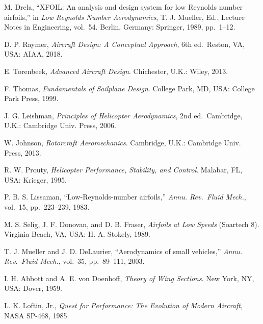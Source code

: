 \documentclass[10pt,a4paper,twocolumn]{article}
\begin{document}
\begingroup\footnotesize\begin{list}{}{\setlength{\leftmargin}{2.2em}\setlength{\labelwidth}{2em}\setlength{\labelsep}{0.3em}\setlength{\itemsep}{1pt}\setlength{\parsep}{0pt}}

\item[{[1]}] M. Drela, ``XFOIL: An analysis and design system for low
Reynolds number airfoils,'' in \emph{Low Reynolds Number Aerodynamics},
T. J. Mueller, Ed., Lecture Notes in Engineering, vol.~54. Berlin,
Germany: Springer, 1989, pp.~1--12.

\item[{[2]}] D. P. Raymer, \emph{Aircraft Design: A Conceptual Approach}, 6th
ed.~Reston, VA, USA: AIAA, 2018.

\item[{[3]}] E. Torenbeek, \emph{Advanced Aircraft Design}. Chichester, U.K.:
Wiley, 2013.

\item[{[4]}] F. Thomas, \emph{Fundamentals of Sailplane Design}. College
Park, MD, USA: College Park Press, 1999.

\item[{[5]}] J. G. Leishman, \emph{Principles of Helicopter Aerodynamics},
2nd ed.~Cambridge, U.K.: Cambridge Univ. Press, 2006.

\item[{[6]}] W. Johnson, \emph{Rotorcraft Aeromechanics}. Cambridge, U.K.:
Cambridge Univ. Press, 2013.

\item[{[7]}] R. W. Prouty, \emph{Helicopter Performance, Stability, and
Control}. Malabar, FL, USA: Krieger, 1995.

\item[{[8]}] P. B. S. Lissaman, ``Low-Reynolds-number airfoils,'' \emph{Annu.
Rev.~Fluid Mech.}, vol.~15, pp.~223--239, 1983.

\item[{[9]}] M. S. Selig, J. F. Donovan, and D. B. Fraser, \emph{Airfoils at
Low Speeds} (Soartech 8). Virginia Beach, VA, USA: H. A. Stokely, 1989.

\item[{[10]}] T. J. Mueller and J. D. DeLaurier, ``Aerodynamics of small
vehicles,'' \emph{Annu. Rev.~Fluid Mech.}, vol.~35, pp.~89--111, 2003.

\item[{[11]}] I. H. Abbott and A. E. von Doenhoff, \emph{Theory of Wing
Sections}. New York, NY, USA: Dover, 1959.

\item[{[12]}] L. K. Loftin, Jr., \emph{Quest for Performance: The Evolution
of Modern Aircraft}, NASA SP-468, 1985.


\end{list}
\end{document}
